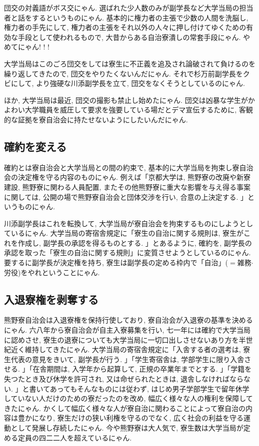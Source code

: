 \documentclass[10pt,b5jsbook,dvips,dvipdfmx,openany]{jsbook}
\theoremstyle{definition}
\begin{document}
			団交の対義語がボス交にゃん. 選ばれた少人数のみが副学長など大学当局の担当者と話をするというものにゃん. 基本的に権力者の主張で少数の人間を洗脳し, 権力者の手先にして, 権力者の主張をそれ以外の人々に押し付けてゆくための有効な手段として使われるもので, 大昔からある自治寮潰しの常套手段にゃん. やめてにゃん! ! !

			大学当局はこのごろ団交をしては寮生に不正義を追及され論破されて負けるのを繰り返してきたので, 団交をやりたくないんだにゃん. それで杉万前副学長をクビにして, より強硬な川添副学長を立て, 団交をなくそうとしているのにゃん.

			ほか, 大学当局は最近, 団交の撮影も禁止し始めたにゃん. 団交は凶暴な学生がかよわい大学職員を威圧して要求を強要している場だとデマ宣伝するために, 客観的な証拠を寮自治会に持たせないようにしたいんだにゃん.

			\subsection{確約を変える}
			確約とは寮自治会と大学当局との間の約束で, 基本的に大学当局を拘束し寮自治会の決定権を守る内容のものにゃん. 例えば「京都大学は, 熊野寮の改廃や新寮建設, 熊野寮に関わる人員配置, またその他熊野寮に重大な影響を与え得る事案に関しては, 公開の場で熊野寮自治会と団体交渉を行い, 合意の上決定する. 」というものにゃん.

			川添副学長はこれを転換して, 大学当局が寮自治会を拘束するものにしようとしているにゃん. 大学当局の寄宿舎規定に「寮生の自治に関する規則は, 寮生がこれを作成し, 副学長の承認を得るものとする. 」とあるように, 確約を, 副学長の承認を取った「寮生の自治に関する規則」に変質させようとしているのにゃん. 要するに副学長が決定権を持ち, 寮生は副学長の定める枠内で「自治」($=$雑務$ \cdot $ 労役)をやれということにゃん.

			\subsection{入退寮権を剥奪する}
			熊野寮自治会は入退寮権を保持行使しており, 寮自治会が入退寮の基準を決めるにゃん. 六八年から寮自治会が自主入寮募集を行い, 七一年には確約で大学当局に認めさせ, 寮生の退寮についても大学当局に一切口出しさせないあり方を半世紀近く維持してきたにゃん. 大学当局の寄宿舎規定に「入舎する者の選考は, 寮生代表の意見をきいて, 副学長が行う. 」「学生寄宿舎は, 学部学生に限り入舎させる. 」「在舎期間は, 入学年から起算して, 正規の卒業年までとする. 」「学籍を失つたとき及び休学を許可され, 又は命ぜられたときは, 退舎しなければならない. 」と書いてあってもそんなものには従わず, はじめ男子学部学生で留年休学していない人だけのための寮だったのを改め, 幅広く様々な人の権利を保障してきたにゃん. かくして幅広く様々な人が寮自治に関わることによって寮自治の内容は豊かになり, 寮生だけの狭い利権を守るのでなく, 広く社会の利益を守る運動として発展し存続したにゃん. 今や熊野寮は大人気で, 寮生数は大学当局が定める定員の四二二人を超えているにゃん.
\end{document}
